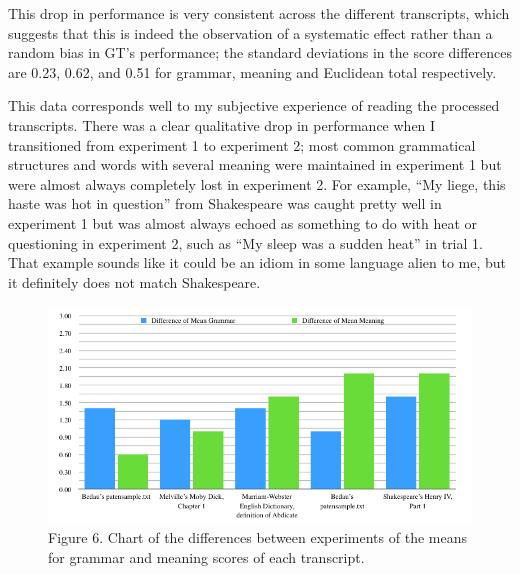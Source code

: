 \documentclass{article}
\begin{document}
This drop in performance is very consistent across the different transcripts, which suggests that this is indeed the observation of a systematic effect rather than a random bias in GT's performance; the standard deviations in the score differences are 0.23, 0.62, and 0.51 for grammar, meaning and Euclidean total respectively.





This data corresponds well to my subjective experience of reading the processed transcripts. There was a clear qualitative drop in performance when I transitioned from experiment 1 to experiment 2; most common grammatical structures and words with several meaning were maintained in experiment 1 but were almost always completely lost in experiment 2. For example, ``My liege, this haste was hot in question'' from Shakespeare was caught pretty well in experiment 1 but was almost always echoed as something to do with heat or questioning in experiment 2, such as ``My sleep was a sudden heat'' in trial 1. That example sounds like it could be an idiom in some language alien to me, but it definitely does not match Shakespeare.



\begin{figure}[h]
\centering
\includegraphics[width=15cm,keepaspectratio]{images/lang-diffs-grammar-meaning-chart.png}
\captionsetup{labelformat=empty} \caption{Figure 6. Chart of the differences between experiments of the means for grammar and meaning scores of each transcript.}
\end{figure}
\end{document}

